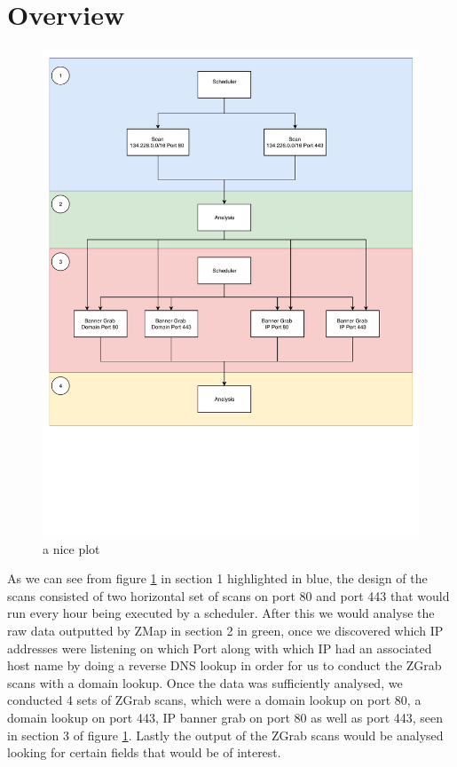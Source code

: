 \documentclass[a4wide,leqno,12pt]{report}
\begin{document}
\section{Overview}
\begin{figure}[h!]
\includegraphics[scale=.5]{pdf_images/design}
\caption{a nice plot}
\label{fig:design}
\end{figure}

As we can see from figure \ref{fig:design} in section 1 highlighted in blue,
the design of the scans consisted of two horizontal set of scans on port 80 and port 443 that would run every hour being executed by a scheduler. After this we would analyse the raw data outputted by ZMap in section 2 in green, once we discovered which IP addresses were listening on which Port along with which IP had an associated host name by doing a reverse DNS lookup in order for us to conduct the ZGrab scans with a domain lookup. Once the data was sufficiently analysed, we conducted 4 sets of ZGrab scans, which were a domain lookup on port 80, a domain lookup on port 443, IP banner grab on port 80 as well as port 443, seen in section 3 of figure \ref{fig:design}. Lastly the output of the ZGrab scans would be analysed looking for certain fields that would be of interest.
\end{document}
